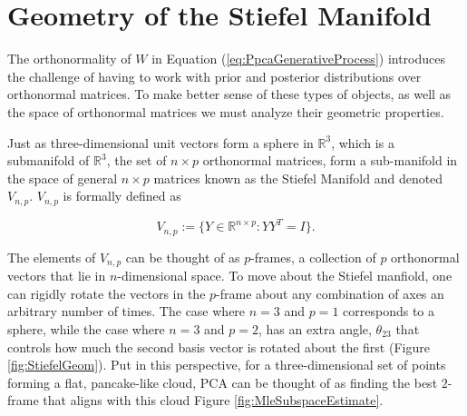 \documentclass{article}
\begin{document}

\section{Geometry of the Stiefel Manifold} \label{geometry}

The orthonormality of $W$ in Equation (\ref{eq:PpcaGenerativeProcess}) introduces the challenge of having to work with prior and posterior distributions over orthonormal matrices. To make better sense of these types of objects, as well as the space of orthonormal matrices we must analyze their geometric properties.

Just as three-dimensional unit vectors form a sphere in $\mathbb{R}^3$, which is a submanifold of $\mathbb{R}^3$, the set of $n\times p$ orthonormal matrices, form a sub-manifold in the space of general $n \times p$ matrices known as the Stiefel Manifold and denoted $V_{n,p}$\citep{muirhead2009aspects}. $V_{n,p}$ is formally defined as

\begin{equation}
V_{n,p} := \{Y \in \mathbb{R}^{n \times p}: YY^T = I \}.
\end{equation}

The elements of $V_{n,p}$ can be thought of as $p$-frames, a collection of $p$ orthonormal vectors that lie in $n$-dimensional space. To move about the Stiefel manfiold, one can rigidly rotate the vectors in the $p$-frame about any combination of axes an arbitrary number of times. The case where $n = 3$ and $p = 1$ corresponds to a sphere, while the case where $n = 3$ and $p = 2$, has an extra angle, $\theta_{23}$ that controls how much the second basis vector is rotated about the first (Figure \ref{fig:StiefelGeom}). Put in this perspective, for a three-dimensional set of points forming a flat, pancake-like cloud, PCA can be thought of as finding the best $2$-frame that aligns with this cloud Figure \ref{fig:MleSubspaceEstimate}.
\end{document}
